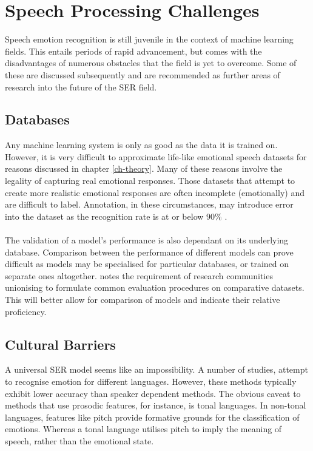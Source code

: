
\section{Speech Processing Challenges}
Speech emotion recognition is still juvenile in the context of machine learning fields. This entails periods of rapid advancement, but comes with the disadvantages of numerous obstacles that the field is yet to overcome. Some of these are discussed subsequently and are recommended as further areas of research into the future of the SER field.

\subsection{Databases}
Any machine learning system is only as good as the data it is trained on. However, it is very difficult to approximate life-like emotional speech datasets for reasons discussed in chapter \ref{ch-theory}. Many of these reasons involve the legality of capturing real emotional responses. Those datasets that attempt to create more realistic emotional responses are often incomplete (emotionally) and are difficult to label. Annotation, in these circumstances, may introduce error into the dataset as the recognition rate is at or below $90\%$ \cite{surveyCORE1}.\\ \\
The validation of a model's performance is also dependant on its underlying database. Comparison between the performance of different models can prove difficult as models may be specialised for particular databases, or trained on separate ones altogether. \cite{zeng2009} notes the requirement of research communities unionising to formulate common evaluation procedures on comparative datasets. This will better allow for comparison of models and indicate their relative proficiency. 

\subsection{Cultural Barriers}
A universal SER model seems like an impossibility. A number of studies, attempt to recognise emotion for different languages. However, these methods typically exhibit lower accuracy than speaker dependent methods. The obvious caveat to methods that use prosodic features, for instance, is tonal languages. In non-tonal languages, features like pitch provide formative grounds for the classification of emotions. Whereas a tonal language utilises pitch to imply the meaning of speech, rather than the emotional state.

